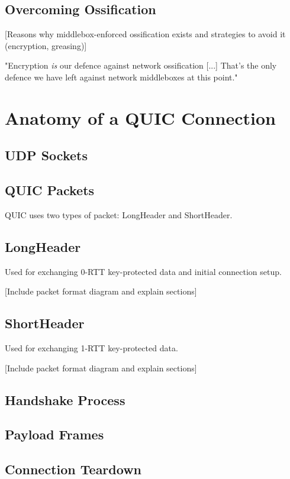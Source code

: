 \documentclass{l4proj}
\begin{document}
\subsection{Overcoming Ossification}
[Reasons why middlebox-enforced ossification exists and strategies to avoid it (encryption, greasing)]

"Encryption \textit{is} our defence against network ossification [...] That's the only defence we have left against network middleboxes at this point." \cite{iyengar-ossification}

\section{Anatomy of a QUIC Connection}

\subsection{UDP Sockets}

\subsection{QUIC Packets}
QUIC uses two types of packet: LongHeader and ShortHeader.

\subsection{LongHeader}
Used for exchanging 0-RTT key-protected data and initial connection setup.

[Include packet format diagram and explain sections]

\subsection{ShortHeader}
Used for exchanging 1-RTT key-protected data.

[Include packet format diagram and explain sections]

\subsection{Handshake Process}

\subsection{Payload Frames}

\subsection{Connection Teardown}
\end{document}
